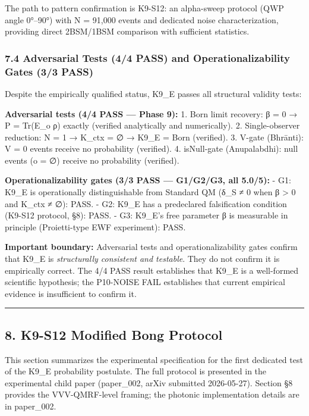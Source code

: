\documentclass[
  11pt,
]{article}
\begin{document}
The path to pattern confirmation is K9-S12: an alpha-sweep protocol (QWP
angle 0°--90°) with N = 91,000 events and dedicated noise
characterization, providing direct 2BSM/1BSM comparison with sufficient
statistics.

\subsubsection{7.4 Adversarial Tests (4/4 PASS) and Operationalizability
Gates (3/3
PASS)}\label{adversarial-tests-44-pass-and-operationalizability-gates-33-pass}

Despite the empirically qualified status, K9\_E passes all structural
validity tests:

\textbf{Adversarial tests (4/4 PASS --- Phase 9):} 1. Born limit
recovery: β = 0 → P = Tr(E\_o ρ) exactly (verified analytically and
numerically). 2. Single-observer reduction: N = 1 → K\_ctx = ∅ → K9\_E =
Born (verified). 3. V-gate (Bhrānti): V = 0 events receive no
probability (verified). 4. isNull-gate (Anupalabdhi): null events (o =
∅) receive no probability (verified).

\textbf{Operationalizability gates (3/3 PASS --- G1/G2/G3, all 5.0/5):}
- G1: K9\_E is operationally distinguishable from Standard QM (δ\_S ≠ 0
when β \textgreater{} 0 and K\_ctx ≠ ∅): PASS. - G2: K9\_E has a
predeclared falsification condition (K9-S12 protocol, §8): PASS. - G3:
K9\_E's free parameter β is measurable in principle (Proietti-type EWF
experiment): PASS.

\textbf{Important boundary:} Adversarial tests and operationalizability
gates confirm that K9\_E is \emph{structurally consistent and testable}.
They do not confirm it is empirically correct. The 4/4 PASS result
establishes that K9\_E is a well-formed scientific hypothesis; the
P10-NOISE FAIL establishes that current empirical evidence is
insufficient to confirm it.

\begin{center}\rule{0.5\linewidth}{0.5pt}\end{center}

\subsection{8. K9-S12 Modified Bong
Protocol}\label{k9-s12-modified-bong-protocol}

This section summarizes the experimental specification for the first
dedicated test of the K9\_E probability postulate. The full protocol is
presented in the experimental child paper (paper\_002, arXiv submitted
2026-05-27). Section §8 provides the VVV-QMRF-level framing; the
photonic implementation details are in paper\_002.
\end{document}
